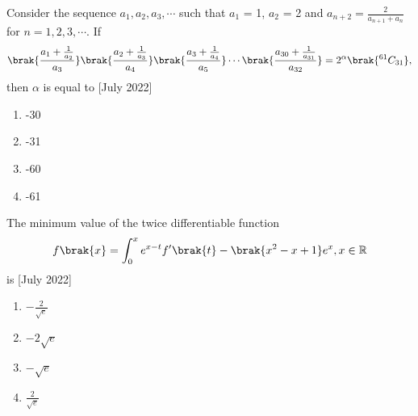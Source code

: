 \item Consider the sequence $a_1, a_2, a_3, \cdots$ such that $a_1$ = 1, $a_2$ = 2 and $a_{n+2} = \frac{2}{a_{n+1} + a_n}$ for $n = 1, 2, 3, \cdots$. If 
\begin{align*}
    \brak{\frac{a_1 + \frac{1}{a_2}}{a_3}}\brak{\frac{a_2 + \frac{1}{a_3}}{a_4}}\brak{\frac{a_3 + \frac{1}{a_4}}{a_5}}\cdots\brak{\frac{a_{30} + \frac{1}{a_{31}}}{a_{32}}} = 2^{\alpha}\brak{^{61}C_{31}},
\end{align*}
then $\alpha$ is equal to \hfill[July 2022]
 \begin{enumerate}
     \item -30
     \item -31
     \item -60
     \item -61\\
 \end{enumerate}
\item The minimum value of the twice differentiable function
\begin{align*}
    f\brak{x} = \int_{0}^{x}e^{x-t}f'\brak{t} - \brak{x^2 - x + 1}e^{x}, x\in\mathbb{R}
\end{align*}
is \hfill[July 2022]
\begin{enumerate}
    \item $-\frac{2}{\sqrt{e}}$
    \item $-2\sqrt{e}$
    \item $-\sqrt{e}$
    \item $\frac{2}{\sqrt{e}}$\\
\end{enumerate}
